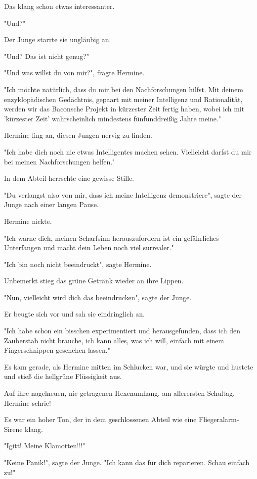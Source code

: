 {Das klang schon etwas interessanter.

"Und?"

Der Junge starrte sie ungläubig an.

"Und? Das ist nicht genug?"

"Und was willst du von mir?", fragte Hermine.

"Ich möchte natürlich, dass du mir bei den Nachforschungen hilfst. Mit deinem enzyklopädischen Gedächtnis, gepaart mit meiner Intelligenz und Rationalität, werden wir das Baconsche Projekt in kürzester Zeit fertig haben, wobei ich mit 'kürzester Zeit' wahrscheinlich mindestens fünfunddreißig Jahre meine."

Hermine fing an, diesen Jungen nervig zu finden.

"Ich habe dich noch nie etwas Intelligentes machen sehen. Vielleicht darfst du mir bei meinen Nachforschungen helfen."

In dem Abteil herrschte eine gewisse Stille.

"Du verlangst also von mir, dass ich meine Intelligenz demonstriere", sagte der Junge nach einer langen Pause.

Hermine nickte.

"Ich warne dich, meinen Scharfsinn herauszufordern ist ein gefährliches Unterfangen und macht dein Leben noch viel surrealer."

"Ich bin noch nicht beeindruckt", sagte Hermine.

Unbemerkt stieg das grüne Getränk wieder an ihre Lippen.

"Nun, vielleicht wird dich das beeindrucken", sagte der Junge.

Er beugte sich vor und sah sie eindringlich an.

"Ich habe schon ein bisschen experimentiert und herausgefunden, dass ich den Zauberstab nicht brauche, ich kann alles, was ich will, einfach mit einem Fingerschnippen geschehen lassen."

Es kam gerade, als Hermine mitten im Schlucken war, und sie würgte und hustete und stieß die hellgrüne Flüssigkeit aus.

Auf ihre nagelneuen, nie getragenen Hexenumhang, am allerersten Schultag. Hermine schrie!

Es war ein hoher Ton, der in dem geschlossenen Abteil wie eine Fliegeralarm-Sirene klang.

"Igitt! Meine Klamotten!!!"

"Keine Panik!", sagte der Junge. "Ich kann das für dich reparieren. Schau einfach zu!"

}
